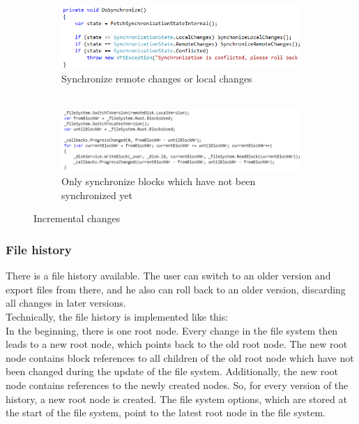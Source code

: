 \documentclass[JCDReport.tex]{subfiles}
\begin{document}
\begin{figure}[h!]
	\begin{subfigure}[b]{1\textwidth}
		\centering
		\includegraphics[scale=1]{Images/do_synchronization.png} 
		\caption{Synchronize remote changes or local changes\\\ \\} %
	\end{subfigure}
	
	\begin{subfigure}[b]{1\textwidth}
		\centering
		\includegraphics[scale=1]{Images/incremental_changes.png}
		\caption{Only synchronize blocks which have not been synchronized yet}
	\end{subfigure}
	\caption{Incremental changes}
\end{figure}



\subsubsection{File history}
There is a file history available. The user can switch to an older version and export files from there, and he also can roll back to an older version, discarding all changes in later versions.\\
Technically, the file history is implemented like this:\\
In the beginning, there is one root node. Every change in the file system then leads to a new root node, which points back to the old root node. The new root node contains block references to all children of the old root node which have not been changed during the update of the file system. Additionally, the new root node contains references to the newly created nodes. So, for every version of the history, a new root node is created. The file system options, which are stored at the start of the file system, point to the latest root node in the file system.\\
\end{document}
